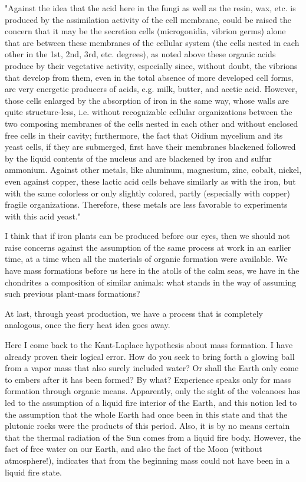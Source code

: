 \documentclass[a4paper, 11pt, oneside]{article}
\begin{document}
"Against the idea that the acid here in the fungi as well as the resin, wax, etc. is produced by the assimilation activity of the cell membrane, could be raised the concern that it may be the secretion cells (microgonidia, vibrion germs) alone that are between these membranes of the cellular system (the cells nested in each other in the 1st, 2nd, 3rd, etc. degrees), as noted above these organic acids produce by their vegetative activity, especially since, without doubt, the vibrions that develop from them, even in the total absence of more developed cell forms, are very energetic producers of acids, e.g. milk, butter, and acetic acid. However, those cells enlarged by the absorption of iron in the same way, whose walls are quite structure-less, i.e. without recognizable cellular organizations between the two composing membranes of the cells nested in each other and without enclosed free cells in their cavity; furthermore, the fact that Oidium mycelium and its yeast cells, if they are submerged, first have their membranes blackened followed by the liquid contents of the nucleus and are blackened by iron and sulfur ammonium. Against other metals, like aluminum, magnesium, zinc, cobalt, nickel, even against copper, these lactic acid cells behave similarly as with the iron, but with the same colorless or only slightly colored, partly (especially with copper) fragile organizations. Therefore, these metals are less favorable to experiments with this acid yeast."

I think that if iron plants can be produced before our eyes, then we should not raise concerns against the assumption of the same process at work in an earlier time, at a time when all the materials of organic formation were available. We have mass formations before us here in the atolls of the calm seas, we have in the chondrites a composition of similar animals: what stands in the way of assuming such previous plant-mass formations?

At last, through yeast production, we have a process that is completely analogous, once the fiery heat idea goes away.

Here I come back to the Kant-Laplace hypothesis about mass formation. I have already proven their logical error. How do you seek to bring forth a glowing ball from a vapor mass that also surely included water? Or shall the Earth only come to embers after it has been formed? By what? Experience speaks only for mass formation through organic means. Apparently, only the sight of the volcanoes has led to the assumption of a liquid fire interior of the Earth, and this notion led to the assumption that the whole Earth had once been in this state and that the plutonic rocks were the products of this period. Also, it is by no means certain that the thermal radiation of the Sun comes from a liquid fire body. However, the fact of free water on our Earth, and also the fact of the Moon (without atmosphere!), indicates that from the beginning mass could not have been in a liquid fire state.
\end{document}
